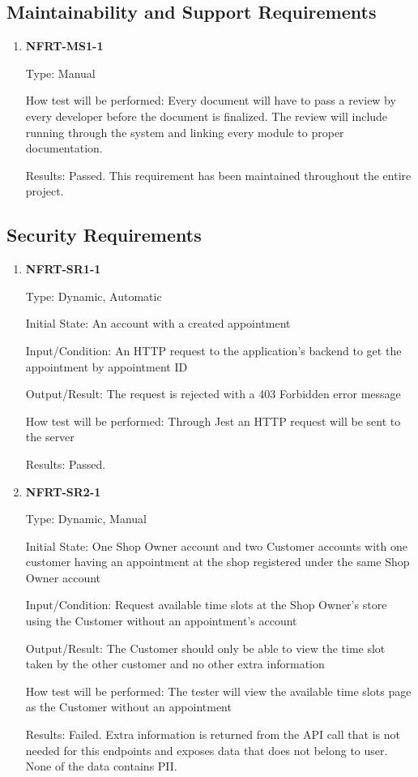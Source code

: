 \documentclass[12pt, titlepage]{article}
\begin{document}
\subsection{Maintainability and Support Requirements}
\begin{enumerate}
	\item \textbf{NFRT-MS1-1}

	      Type: Manual

	      How test will be performed: Every document will have to pass a review by every developer before the
	      document is finalized. The review will include running through the system and linking every module
	      to proper documentation.

	      Results: Passed. This requirement has been maintained throughout the entire project.

\end{enumerate}

\subsection{Security Requirements}
\begin{enumerate}

	\item \textbf{NFRT-SR1-1}

	      Type: Dynamic, Automatic

	      Initial State: An account with a created appointment

	      Input/Condition: An HTTP request to the application's backend to get the appointment by appointment
	      ID

	      Output/Result: The request is rejected with a 403 Forbidden error message

	      How test will be performed: Through Jest an HTTP request will be sent to the server

	      Results: Passed.

	\item \textbf{NFRT-SR2-1}

	      Type: Dynamic, Manual

	      Initial State: One Shop Owner account and two Customer accounts with one customer having an
	      appointment at the shop registered under the same Shop Owner account

	      Input/Condition: Request available time slots at the Shop Owner's store using the Customer without
	      an appointment's account

	      Output/Result: The Customer should only be able to view the time slot taken by the other customer
	      and no other extra information

	      How test will be performed: The tester will view the available time slots page as the Customer
	      without an appointment

	      Results: Failed. Extra information is returned from the API call that is not needed for this
	      endpoints and exposes data that does not belong to user. None of the data contains PII.

\end{enumerate}
\end{document}
